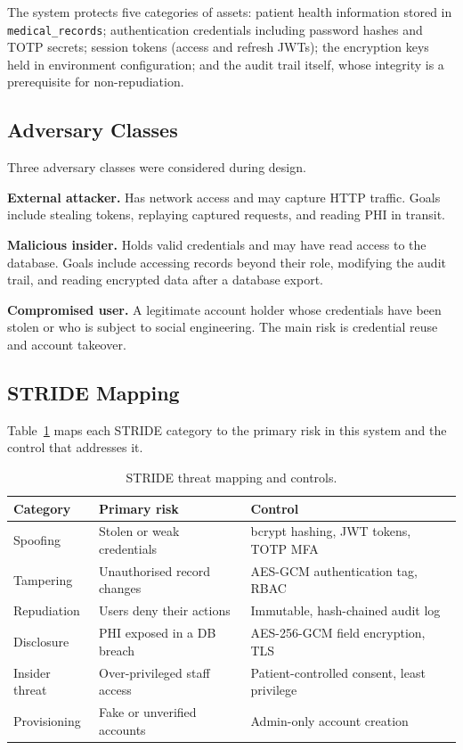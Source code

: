 \documentclass[11pt,a4paper]{article}
\begin{document}
The system protects five categories of assets: patient health information
stored in \texttt{medical\_records}; authentication credentials including
password hashes and TOTP secrets; session tokens (access and refresh JWTs);
the encryption keys held in environment configuration; and the audit trail
itself, whose integrity is a prerequisite for non-repudiation.

\subsection{Adversary Classes}

Three adversary classes were considered during design.

\textbf{External attacker.} Has network access and may capture HTTP traffic.
Goals include stealing tokens, replaying captured requests, and reading PHI
in transit.

\textbf{Malicious insider.} Holds valid credentials and may have read access
to the database. Goals include accessing records beyond their role, modifying
the audit trail, and reading encrypted data after a database export.

\textbf{Compromised user.} A legitimate account holder whose credentials have
been stolen or who is subject to social engineering. The main risk is
credential reuse and account takeover.

\subsection{STRIDE Mapping}

Table~\ref{tab:stride} maps each STRIDE category to the primary risk in this
system and the control that addresses it.

\begin{table}[H]
\centering
\small
\setlength{\tabcolsep}{6pt}
\begin{tabular}{p{2.4cm}p{3.5cm}p{5cm}}
\toprule
\textbf{Category} & \textbf{Primary risk} & \textbf{Control} \\
\midrule
Spoofing        & Stolen or weak credentials      & bcrypt hashing, JWT tokens, TOTP MFA \\
Tampering       & Unauthorised record changes     & AES-GCM authentication tag, RBAC \\
Repudiation     & Users deny their actions        & Immutable, hash-chained audit log \\
Disclosure      & PHI exposed in a DB breach      & AES-256-GCM field encryption, TLS \\
Insider threat  & Over-privileged staff access    & Patient-controlled consent, least privilege \\
Provisioning    & Fake or unverified accounts     & Admin-only account creation \\
\bottomrule
\end{tabular}
\caption{STRIDE threat mapping and controls.}
\label{tab:stride}
\end{table}
\end{document}
